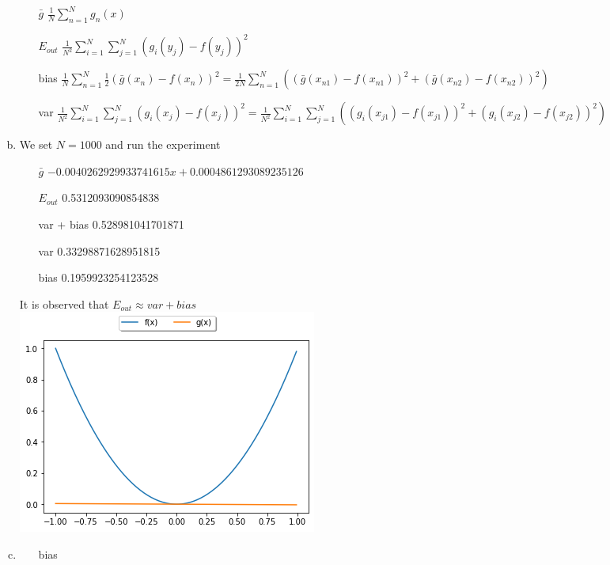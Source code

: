 \documentclass{article}
\def\math#1{$#1$}
\begin{document}
\begin{enumerate}[a)]
    \begin{itemize}
        \item [\math{\bar{g}}] \math{\frac{1}{N}\sum_{n=1}^N g_n(x)}
        \item [\math{E_{out}}] \math{\frac{1}{N^2} \sum_{i=1}^N \sum_{j=1}^N (g_i(y_j) - f(y_j))^2}
        \item [bias] \math{\frac{1}{N}\sum_{n=1}^N \frac{1}{2} (\bar{g}(x_n) - f(x_n))^2 = \frac{1}{2N}\sum_{n=1}^N ((\bar{g}(x_{n1}) - f(x_{n1}))^2 + (\bar{g}(x_{n2}) - f(x_{n2}))^2) }
        \item [var] \math{\frac{1}{N^2} \sum_{i=1}^N \sum_{j=1}^N (g_i(x_{j}) - f(x_{j}))^2 = \frac{1}{N^2} \sum_{i=1}^N \sum_{j=1}^N ( (g_i(x_{j1}) - f(x_{j1}))^2 + (g_i(x_{j2}) - f(x_{j2}))^2)} 
    \end{itemize}
    \item We set \math{N = 1000} and run the experiment
        \begin{itemize}
            \item [\math{\bar{g}}] \math{-0.0040262929933741615x + 0.0004861293089235126}
            \item [\math{E_{out}}] 0.5312093090854838
            \item [var + bias] 0.528981041701871
            \item [var] 0.33298871628951815
            \item [bias] 0.1959923254123528
        \end{itemize}
        It is observed that \math{E_{out} \approx var + bias} \\
        \includegraphics{2.15/2}
    \item 
        \begin{itemize}
            \item [bias]
                \begin{equation}

\end{equation}
\end{itemize}
\end{enumerate}
\end{document}
